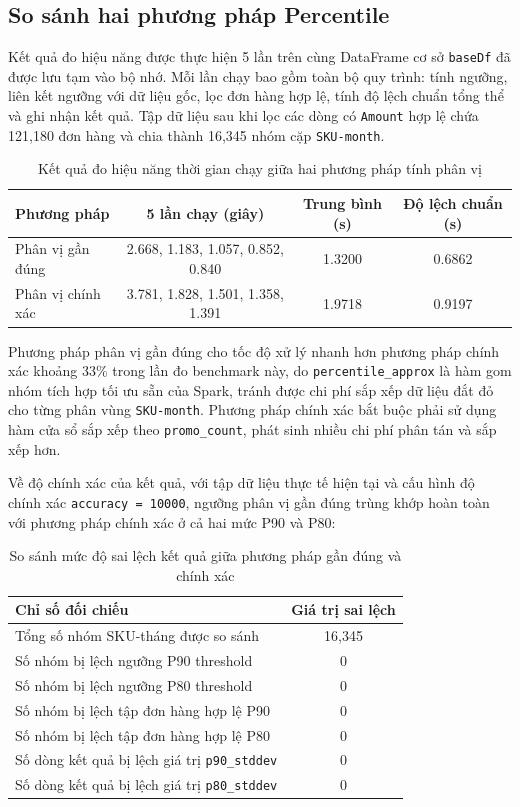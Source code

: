 \subsection{So sánh hai phương pháp Percentile}

Kết quả đo hiệu năng được thực hiện 5 lần trên cùng DataFrame cơ sở \texttt{baseDf} đã được lưu tạm vào bộ nhớ. Mỗi lần chạy bao gồm toàn bộ quy trình: tính ngưỡng, liên kết ngưỡng với dữ liệu gốc, lọc đơn hàng hợp lệ, tính độ lệch chuẩn tổng thể và ghi nhận kết quả. Tập dữ liệu sau khi lọc các dòng có \texttt{Amount} hợp lệ chứa 121,180 đơn hàng và chia thành 16,345 nhóm cặp \texttt{SKU-month}.

\begin{table}[H]
\centering
\begin{tabular}{lccc}
\toprule
\textbf{Phương pháp} & \textbf{5 lần chạy (giây)} & \textbf{Trung bình (s)} & \textbf{Độ lệch chuẩn (s)} \\
\midrule
Phân vị gần đúng & 2.668, 1.183, 1.057, 0.852, 0.840 & 1.3200 & 0.6862 \\
Phân vị chính xác & 3.781, 1.828, 1.501, 1.358, 1.391 & 1.9718 & 0.9197 \\
\bottomrule
\end{tabular}
\caption{Kết quả đo hiệu năng thời gian chạy giữa hai phương pháp tính phân vị}
\label{tab:task2_2_benchmark}
\end{table}

Phương pháp phân vị gần đúng cho tốc độ xử lý nhanh hơn phương pháp chính xác khoảng 33\% trong lần đo benchmark này, do \texttt{percentile\_approx} là hàm gom nhóm tích hợp tối ưu sẵn của Spark, tránh được chi phí sắp xếp dữ liệu đắt đỏ cho từng phân vùng \texttt{SKU-month}. Phương pháp chính xác bắt buộc phải sử dụng hàm cửa sổ sắp xếp theo \texttt{promo\_count}, phát sinh nhiều chi phí phân tán và sắp xếp hơn.

Về độ chính xác của kết quả, với tập dữ liệu thực tế hiện tại và cấu hình độ chính xác \texttt{accuracy = 10000}, ngưỡng phân vị gần đúng trùng khớp hoàn toàn với phương pháp chính xác ở cả hai mức P90 và P80:
\begin{table}[H]
\centering
\begin{tabular}{lc}
\toprule
\textbf{Chỉ số đối chiếu} & \textbf{Giá trị sai lệch} \\
\midrule
Tổng số nhóm SKU-tháng được so sánh & 16,345 \\
Số nhóm bị lệch ngưỡng P90 threshold & 0 \\
Số nhóm bị lệch ngưỡng P80 threshold & 0 \\
Số nhóm bị lệch tập đơn hàng hợp lệ P90 & 0 \\
Số nhóm bị lệch tập đơn hàng hợp lệ P80 & 0 \\
Số dòng kết quả bị lệch giá trị \texttt{p90\_stddev} & 0 \\
Số dòng kết quả bị lệch giá trị \texttt{p80\_stddev} & 0 \\
\bottomrule
\end{tabular}
\caption{So sánh mức độ sai lệch kết quả giữa phương pháp gần đúng và chính xác}
\label{tab:task2_2_metric_comparison}
\end{table}


